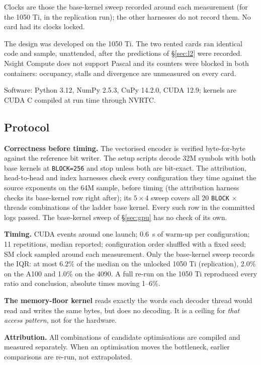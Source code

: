 \documentclass[11pt,a4paper]{article}
\newcommand{\code}[1]{\texttt{#1}}
\newcommand{\B}[1]{\textbf{#1}}
\begin{document}
Clocks are those the base-kernel sweep recorded around each measurement (for the 1050 Ti, in the replication run); the other harnesses do not record them. No card had its clocks locked.

The design was developed on the 1050 Ti. The two rented cards ran identical code and sample, unattended, after the predictions of \S\ref{sec:l2} were recorded. Nsight Compute does not support Pascal and its counters were blocked in both containers: occupancy, stalls and divergence are unmeasured on every card.

Software: Python 3.12, NumPy 2.5.3, CuPy 14.2.0, CUDA 12.9; kernels are CUDA C compiled at run time through NVRTC.

\subsection{Protocol}

\B{Correctness before timing.} The vectorised encoder is verified byte-for-byte against the reference bit writer. The setup scripts decode 32M symbols with both base kernels at \code{BLOCK=256} and stop unless both are bit-exact. The attribution, head-to-head and index harnesses check every configuration they time against the source exponents on the 64M sample, before timing (the attribution harness checks its base-kernel row right after); its $5 \times 4$ sweep covers all 20 \code{BLOCK} $\times$ threads combinations of the ladder base kernel. Every such row in the committed logs passed. The base-kernel sweep of \S\ref{sec:gpu} has no check of its own.

\B{Timing.} CUDA events around one launch; 0.6~s of warm-up per configuration; 11 repetitions, median reported; configuration order shuffled with a fixed seed; SM clock sampled around each measurement. Only the base-kernel sweep records the IQR: at most 6.2\% of the median on the unlocked 1050 Ti (replication), 2.0\% on the A100 and 1.0\% on the 4090. A full re-run on the 1050 Ti reproduced every ratio and conclusion, absolute times moving 1--6\%.

\B{The memory-floor kernel} reads exactly the words each decoder thread would read and writes the same bytes, but does no decoding. It is a ceiling for \emph{that access pattern}, not for the hardware.

\B{Attribution.} All combinations of candidate optimisations are compiled and measured separately. When an optimisation moves the bottleneck, earlier comparisons are re-run, not extrapolated.
\end{document}
